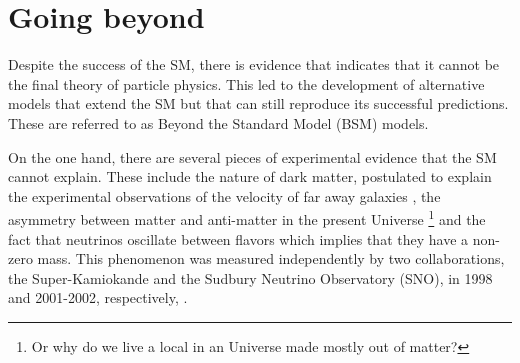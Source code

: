 
\section{Going beyond}
\label{section:BSM}
%
%

Despite the success of the SM, there is evidence that indicates that it cannot be the final theory of particle physics. This led to the development of alternative models that extend the SM but that can still reproduce its successful predictions. These are referred to as Beyond the Standard Model (BSM) models. 

On the one hand, there are several pieces of experimental evidence that the SM cannot explain. These include the nature of dark matter, postulated to explain the experimental observations of the velocity of far away galaxies \cite{DM}, the asymmetry between matter and anti-matter in the present Universe \footnote{Or why do we live a local in an Universe made mostly out of matter?} and the fact that neutrinos oscillate between flavors which implies that they have a non-zero mass. This phenomenon was measured independently by two collaborations, the Super-Kamiokande and the Sudbury Neutrino Observatory (SNO), in 1998 and 2001-2002, respectively, \cite{neutrinosSuperK,neutrinosSNO1,neutrinosSNO2}.

